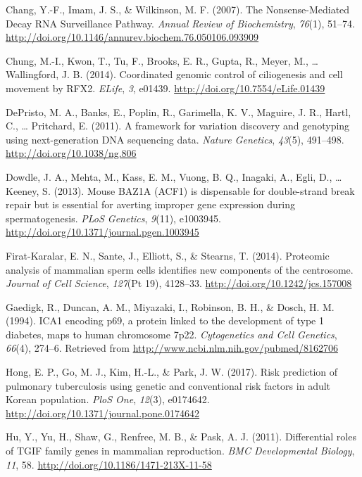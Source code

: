 \documentclass[12pt,twoside]{reedthesis}
\theoremstyle{definition}
\theoremstyle{definition}
\theoremstyle{remark}
\begin{document}
  \hypertarget{ref-Chang2007}{}
  Chang, Y.-F., Imam, J. S., \& Wilkinson, M. F. (2007). The
  Nonsense-Mediated Decay RNA Surveillance Pathway. \emph{Annual Review of
  Biochemistry}, \emph{76}(1), 51--74.
  \url{http://doi.org/10.1146/annurev.biochem.76.050106.093909}
  
  \hypertarget{ref-Chung2014}{}
  Chung, M.-I., Kwon, T., Tu, F., Brooks, E. R., Gupta, R., Meyer, M.,
  \ldots{} Wallingford, J. B. (2014). Coordinated genomic control of
  ciliogenesis and cell movement by RFX2. \emph{ELife}, \emph{3}, e01439.
  \url{http://doi.org/10.7554/eLife.01439}
  
  \hypertarget{ref-DePristo2011}{}
  DePristo, M. A., Banks, E., Poplin, R., Garimella, K. V., Maguire, J.
  R., Hartl, C., \ldots{} Pritchard, E. (2011). A framework for variation
  discovery and genotyping using next-generation DNA sequencing data.
  \emph{Nature Genetics}, \emph{43}(5), 491--498.
  \url{http://doi.org/10.1038/ng.806}
  
  \hypertarget{ref-Dowdle2013}{}
  Dowdle, J. A., Mehta, M., Kass, E. M., Vuong, B. Q., Inagaki, A., Egli,
  D., \ldots{} Keeney, S. (2013). Mouse BAZ1A (ACF1) is dispensable for
  double-strand break repair but is essential for averting improper gene
  expression during spermatogenesis. \emph{PLoS Genetics}, \emph{9}(11),
  e1003945. \url{http://doi.org/10.1371/journal.pgen.1003945}
  
  \hypertarget{ref-Firat-Karalar2014}{}
  Firat-Karalar, E. N., Sante, J., Elliott, S., \& Stearns, T. (2014).
  Proteomic analysis of mammalian sperm cells identifies new components of
  the centrosome. \emph{Journal of Cell Science}, \emph{127}(Pt 19),
  4128--33. \url{http://doi.org/10.1242/jcs.157008}
  
  \hypertarget{ref-Gaedigk1994}{}
  Gaedigk, R., Duncan, A. M., Miyazaki, I., Robinson, B. H., \& Dosch, H.
  M. (1994). ICA1 encoding p69, a protein linked to the development of
  type 1 diabetes, maps to human chromosome 7p22. \emph{Cytogenetics and
  Cell Genetics}, \emph{66}(4), 274--6. Retrieved from
  \url{http://www.ncbi.nlm.nih.gov/pubmed/8162706}
  
  \hypertarget{ref-Hong2017}{}
  Hong, E. P., Go, M. J., Kim, H.-L., \& Park, J. W. (2017). Risk
  prediction of pulmonary tuberculosis using genetic and conventional risk
  factors in adult Korean population. \emph{PloS One}, \emph{12}(3),
  e0174642. \url{http://doi.org/10.1371/journal.pone.0174642}
  
  \hypertarget{ref-Hu2011}{}
  Hu, Y., Yu, H., Shaw, G., Renfree, M. B., \& Pask, A. J. (2011).
  Differential roles of TGIF family genes in mammalian reproduction.
  \emph{BMC Developmental Biology}, \emph{11}, 58.
  \url{http://doi.org/10.1186/1471-213X-11-58}
  
\end{document}

